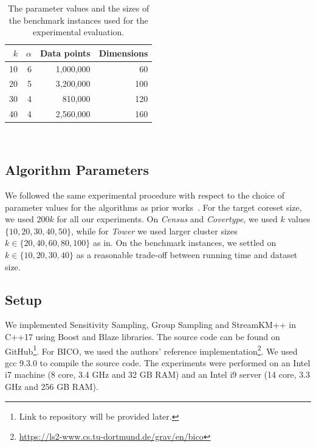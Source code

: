 %
\begin{table}
	\begin{center}%
	\caption{The parameter values and the sizes of the benchmark instances used for the experimental evaluation.}
	\label{tab:benchmark-instances-overview}
	\begin{tabular}{rrrr}
		\toprule
        $k$
		    & $\alpha$
		    & Data points
		    & Dimensions
            \\
		\midrule
        10
    		& 6
    		& 1,000,000
    		& 60
    		\\
        20
    		& 5
    		& 3,200,000
    		& 100
    		\\
        30
    		& 4
    		& 810,000
    		& 120
    		\\
        40
    		& 4
    		& 2,560,000
    		& 160
    		\\
		\bottomrule
	\end{tabular}\\
	\end{center}
\end{table}

\subsection{Algorithm Parameters}
We followed the same experimental procedure with respect to the choice of parameter values for the algorithms as prior works~\cite{FGSSS13, AckermannMRSLS12}. For the target coreset size, we used $200k$ for all our experiments. On \textit{Census} and \textit{Covertype}, we used $k$ values $\{10, 20, 30, 40, 50\}$, while for \textit{Tower} we used larger cluster sizes $k \in \{20, 40, 60, 80, 100\}$ as in. On the benchmark instances, we settled on $k \in \{10, 20, 30, 40\}$ as a reasonable trade-off between running time and dataset size.



\subsection{Setup}
We implemented Sensitivity Sampling, Group Sampling and StreamKM++ in C++17 using Boost and Blaze libraries. The source code can be found on GitHub\footnote{Link to repository will be provided later.}. For BICO, we used the authors' reference implementation\footnote{\url{https://ls2-www.cs.tu-dortmund.de/grav/en/bico}}. We used gcc 9.3.0 to compile the source code.
The experiments were performed on an Intel i7 machine (8 core, 3.4 GHz and 32 GB RAM) and an Intel i9 server (14 core, 3.3 GHz and 256 GB RAM).

